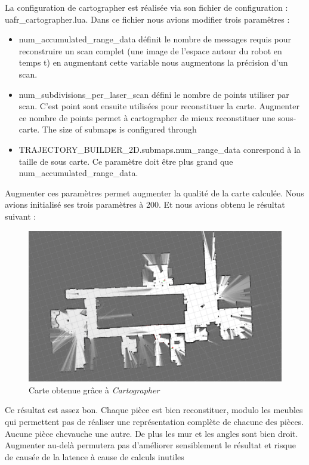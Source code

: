 \documentclass[10pt,a4paper]{article}
\begin{document}
	
		La configuration de cartographer est réalisée via son fichier de configuration : uafr_cartographer.lua. Dans ce fichier nous avions modifier trois paramêtres :
		
			\begin{itemize}
			
			\item num_accumulated_range_data définit le nombre de messages requis pour reconstruire un scan complet (une image de l'espace autour du robot en temps t) en augmentant cette variable nous augmentons la précision d'un scan.
			\item num_subdivisions_per_laser_scan défini le nombre de points utiliser par scan. C'est point sont ensuite utilisées pour reconstituer la carte. Augmenter ce nombre de points permet à cartographer de mieux reconstituer une sous-carte.
			The size of submaps is configured through
			\item TRAJECTORY_BUILDER_2D.submaps.num_range_data conrespond à la taille de sous carte. Ce paramètre doit être plus grand que num_accumulated_range_data.
			
			\end{itemize}
			
		Augmenter ces paramètres permet augmenter la qualité de la carte calculée. Nous avions initialisé ses trois paramètres à 200. Et nous avions obtenu le résultat suivant :
		
		\begin{figure}[h]
   			\begin{center}
   				\includegraphics[width=0.75\linewidth]{map}
   			\end{center}
   			\caption{Carte obtenue grâce à \textit{Cartographer}}
   			\label{fig:map}
   		\end{figure}

		Ce résultat est assez bon. Chaque pièce est bien reconstituer, modulo les meubles qui permettent pas de réaliser une représentation complète de chacune des pièces. Aucune pièce chevauche une autre. De plus les mur et les angles sont bien droit. Augmenter au-delà permutera pas d'améliorer sensiblement le résultat et risque de causée de la latence à cause de calculs inutiles 
   	
\end{document}
